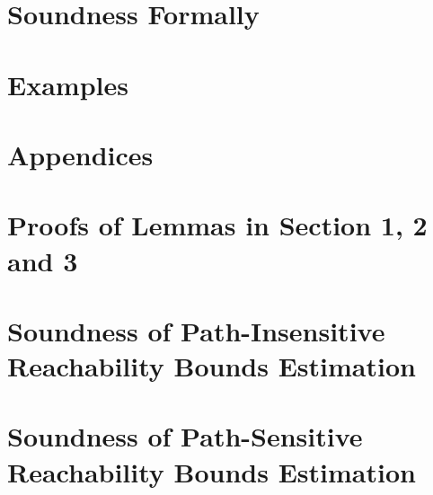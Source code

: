 \documentclass[a4paper,11pt]{article}
\begin{document}
\section{Soundness Formally}
\label{sec:soundness}

% 

\section{Examples}
\label{sec:example}






% 


%
% 
%
\clearpage
\appendix
{}
\section*{Appendices}
\section{Proofs of Lemmas in Section 1, 2 and 3}
\label{apdx:lemma_sec123}

\clearpage
% 
\clearpage
\section{Soundness of Path-Insensitive Reachability Bounds Estimation}
\label{apdx:pathinsensitive_rb_soundness}

\clearpage
\section{Soundness of Path-Sensitive Reachability Bounds Estimation}
\label{apdx:pathsensitive_rb_soundness}


\clearpage


\end{document}

